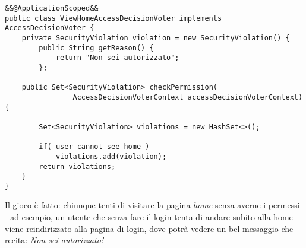 \begin{lstlisting}
&&@ApplicationScoped&&
public class ViewHomeAccessDecisionVoter implements AccessDecisionVoter {
	private SecurityViolation violation = new SecurityViolation() {
		public String getReason() {
			return "Non sei autorizzato";
		};
		
	public Set<SecurityViolation> checkPermission(
				AccessDecisionVoterContext accessDecisionVoterContext) {
				
		Set<SecurityViolation> violations = new HashSet<>();
				
		if( user cannot see home )
			violations.add(violation);
		return violations;
	}
}

\end{lstlisting}
Il gioco è fatto: chiunque tenti di visitare la pagina \textsl{home} senza averne i permessi - ad esempio, un utente che senza fare il login tenta di andare subito alla home - viene reindirizzato alla pagina di login, dove potrà vedere un bel messaggio che recita: \textsl{Non sei autorizzato!}\newline
